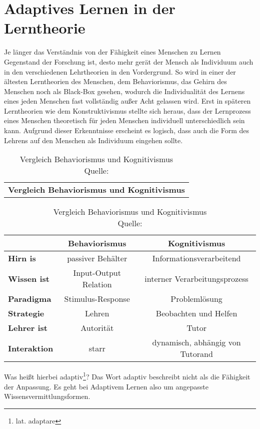 \chapter{Adaptives Lernen in der Lerntheorie}
Je länger das Verständnis von der Fähigkeit eines Menschen zu Lernen Gegenstand der Forschung ist,
desto mehr gerät der Mensch als Individuum auch in den verschiedenen Lehrtheorien in den Vordergrund.
So wird in einer der ältesten Lerntheorien des Menschen, dem Behaviorismus, das Gehirn des Menschen noch als
Black-Box gesehen, wodurch die Individualität des Lernens eines jeden Menschen fast vollständig außer Acht gelassen wird.
Erst in späteren Lerntheorien wie dem Konstruktivismus stellte sich heraus, dass der Lernprozess eines Menschen
theoretisch für jeden Menschen individuell unterschiedlich sein kann.
Aufgrund dieser Erkenntnisse erscheint es logisch, dass auch die Form des Lehrens auf den Menschen als Individuum eingehen sollte.

\begin{table}[!htbp]
	\centering
	\begin{tabular}{c}
		\textbf{Vergleich Behaviorismus und Kognitivismus}
	\end{tabular}

	\begin{tabular}{m{3cm} || c | c}
		\hline
		\  & \textbf{Behaviorismus} & \textbf{Kognitivismus} \\
		\hline
		\textbf{Hirn is} & passiver Behälter & Informationsverarbeitend \\
		\textbf{Wissen ist} & Input-Output Relation & interner Verarbeitungsprozess \\
		\textbf{Paradigma} & Stimulus-Response & Problemlösung  \\
		\textbf{Strategie} & Lehren & Beobachten und Helfen \\
		\textbf{Lehrer ist} & Autorität & Tutor \\
		\textbf{Interaktion} & starr & dynamisch, abhängig von Tutorand \\
	\end{tabular}

	\caption[Vergleich Behaviorismus und Kognitivismus]{Vergleich Behaviorismus und Kognitivismus \\ Quelle: \cite[S. 110, S. 174]{baumgartner1994}}
  \label{tab:behaviorismus_kognitivismus}
\end{table}

Was heißt hierbei adaptiv\footnote{lat. adaptare}?
Das Wort adaptiv beschreibt nicht als die Fähigkeit der Anpassung.
Es geht bei Adaptivem Lernen also um angepasste Wissensvermittlungsformen.

